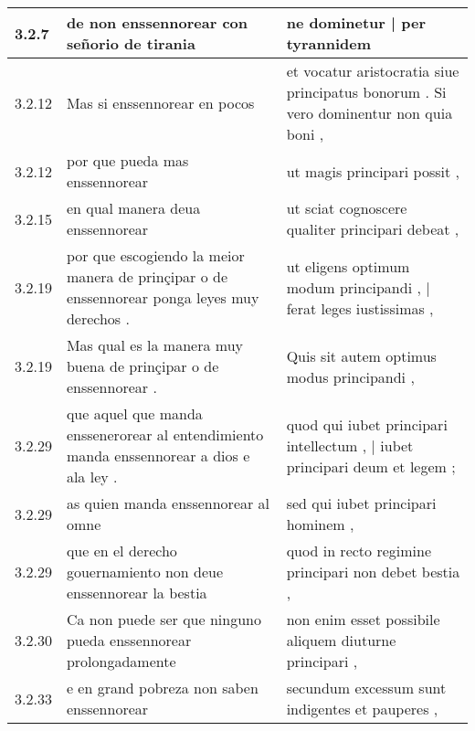 \begin{tabular}{|p{1cm}|p{6.5cm}|p{6.5cm}|}
3.2.7 & de non enssennorear con señorio de tirania & ne dominetur | per tyrannidem \\\hline
3.2.12 & Mas si enssennorear en pocos & et vocatur aristocratia siue principatus bonorum . Si vero dominentur non quia boni , \\\hline
3.2.12 & por que pueda mas enssennorear & ut magis principari possit , \\\hline
3.2.15 & en qual manera deua enssennorear & ut sciat cognoscere qualiter principari debeat , \\\hline
3.2.19 & por que escogiendo la meior manera de prinçipar o de enssennorear ponga leyes muy derechos . & ut eligens optimum modum principandi , | ferat leges iustissimas , \\\hline
3.2.19 & Mas qual es la manera muy buena de prinçipar o de enssennorear . & Quis sit autem optimus modus principandi , \\\hline
3.2.29 & que aquel que manda enssenerorear al entendimiento manda enssennorear a dios e ala ley . & quod qui iubet principari intellectum , | iubet principari deum et legem ; \\\hline
3.2.29 & as quien manda enssennorear al omne & sed qui iubet principari hominem , \\\hline
3.2.29 & que en el derecho gouernamiento non deue enssennorear la bestia & quod in recto regimine principari non debet bestia , \\\hline
3.2.30 & Ca non puede ser que ninguno pueda enssennorear prolongadamente & non enim esset possibile aliquem diuturne principari , \\\hline
3.2.33 & e en grand pobreza non saben enssennorear & secundum excessum sunt indigentes et pauperes , \\\hline

\end{tabular}
